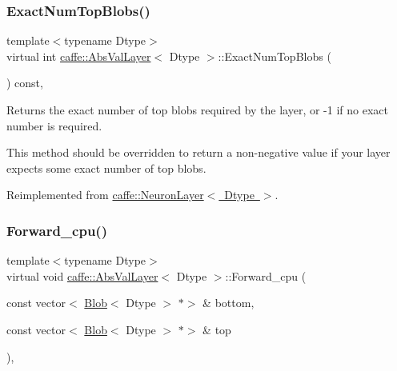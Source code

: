 \subsubsection{\texorpdfstring{Exact\+Num\+Top\+Blobs()}{ExactNumTopBlobs()}\hspace{0.1cm}{\footnotesize\ttfamily [2/2]}}
{\footnotesize\ttfamily template$<$typename Dtype$>$ \\
virtual int \mbox{\hyperlink{classcaffe_1_1_abs_val_layer}{caffe\+::\+Abs\+Val\+Layer}}$<$ Dtype $>$\+::Exact\+Num\+Top\+Blobs (\begin{DoxyParamCaption}{ }\end{DoxyParamCaption}) const\hspace{0.3cm}{\ttfamily [inline]}, {\ttfamily [virtual]}}



Returns the exact number of top blobs required by the layer, or -\/1 if no exact number is required. 

This method should be overridden to return a non-\/negative value if your layer expects some exact number of top blobs. 

Reimplemented from \mbox{\hyperlink{classcaffe_1_1_neuron_layer_a47ac5e7208e4b14ad1e4040a621dbfbc}{caffe\+::\+Neuron\+Layer$<$ Dtype $>$}}.

\mbox{\label{classcaffe_1_1_abs_val_layer_a1d63991d879fef0806b63eb65f275a2b}} 
\subsubsection{\texorpdfstring{Forward\+\_\+cpu()}{Forward\_cpu()}\hspace{0.1cm}{\footnotesize\ttfamily [1/2]}}
{\footnotesize\ttfamily template$<$typename Dtype$>$ \\
virtual void \mbox{\hyperlink{classcaffe_1_1_abs_val_layer}{caffe\+::\+Abs\+Val\+Layer}}$<$ Dtype $>$\+::Forward\+\_\+cpu (\begin{DoxyParamCaption}\item[{const vector$<$ \mbox{\hyperlink{classcaffe_1_1_blob}{Blob}}$<$ Dtype $>$ $\ast$$>$ \&}]{bottom,  }\item[{const vector$<$ \mbox{\hyperlink{classcaffe_1_1_blob}{Blob}}$<$ Dtype $>$ $\ast$$>$ \&}]{top }\end{DoxyParamCaption})\hspace{0.3cm}{\ttfamily [protected]}, {\ttfamily [virtual]}}



